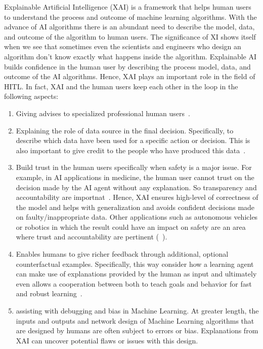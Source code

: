 \documentclass[twoside,11pt]{article}
\begin{document}
Explainable Artificial Intelligence (XAI) is a framework that helps human users to understand the process and outcome of machine learning algorithms. With the advance of AI algorithms there is an abundant need to describe the model, data, and outcome of the algorithm to human users. The significance of XI shows itself when we see that sometimes even the scientists and engineers who design an algorithm don't know exactly what happens inside the algorithm. Explainable AI builds confidence in the human user by describing the process model, data, and outcome of the AI algorithms. Hence, XAI plays an important role in the field of HITL. In fact, XAI and the human users keep each other in the loop in the following aspects:
\begin{enumerate}
    \item Giving advises to specialized professional human users~\cite{zanzotto2019human}.
    \item Explaining the role of data source in the final decision. Specifically, to describe which data have been used for a specific action or decision. This is also important to give credit to the people who have produced this data~\cite{zanzotto2019human}.
    \item Build trust in the human users specifically when safety is a major issue. For example, in AI applications in medicine, the human user cannot trust on the decision made by the AI agent without any explanation. So transparency and accountability are importnat~\cite{Schneeberger:2020:legalAI, Stoeger:2021:MedicalAI}. Hence, XAI ensures high-level of correctness of the model and helps with generalization and avoids confident decisions made on faulty/inappropriate data.  Other applications such as autonomous
vehicles or robotics in which the
result could have an impact on safety are an area where trust
and accountability are pertinent (~\cite{araiza2019safe, wells:2021:explainable}).
\item Enables humans to give richer feedback through additional, optional counterfactual examples. Specifically, this way consider how a learning agent can make use of explanations provided by the human as input and ultimately even allows a cooperation between both to teach goals and behavior for fast and robust learning~\cite{Karalus:2021:HITL-counterfactuals,PuiuttaVeith:2020:xAIRLSurvey}.   
    \item assisting with debugging
and bias in Machine Learning. At greater length, the inputs and outputs and
network design of Machine Learning algorithms that are designed by humans
are often subject to errors or bias. Explanations from
XAI can uncover potential flaws or issues
with this design.
\end{enumerate}
\end{document}
